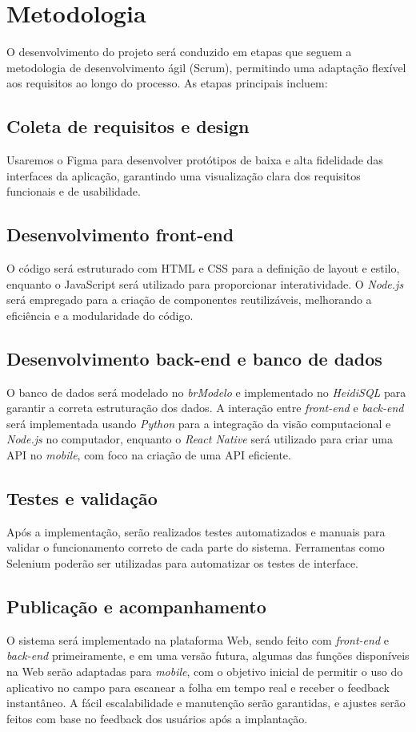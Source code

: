 \section{Metodologia}

O desenvolvimento do projeto será conduzido em etapas que seguem a metodologia de desenvolvimento ágil (Scrum), permitindo uma adaptação flexível aos requisitos ao longo do processo. As etapas principais incluem:

\subsection{Coleta de requisitos e design}
Usaremos o Figma para desenvolver protótipos de baixa e alta fidelidade das interfaces da aplicação, garantindo uma visualização clara dos requisitos funcionais e de usabilidade.

\subsection{Desenvolvimento front-end}
O código será estruturado com HTML e CSS para a definição de layout e estilo, enquanto o JavaScript será utilizado para proporcionar interatividade. O \textit{Node.js} será empregado para a criação de componentes reutilizáveis, melhorando a eficiência e a modularidade do código.

\subsection{Desenvolvimento back-end e banco de dados}
O banco de dados será modelado no \textit{brModelo} e implementado no \textit{HeidiSQL} para garantir a correta estruturação dos dados. A interação entre \textit{front-end} e \textit{back-end} será implementada usando \textit{Python} para a integração da visão computacional e \textit{Node.js} no computador, enquanto o \textit{React Native} será utilizado para criar uma API no \textit{mobile}, com foco na criação de uma API eficiente.

\subsection{Testes e validação}
Após a implementação, serão realizados testes automatizados e manuais para validar o funcionamento correto de cada parte do sistema. Ferramentas como Selenium poderão ser utilizadas para automatizar os testes de interface.

\subsection{Publicação e acompanhamento}
O sistema será implementado na plataforma Web, sendo feito com \textit{front-end} e \textit{back-end} primeiramente, e em uma versão futura, algumas das funções disponíveis na Web serão adaptadas para \textit{mobile}, com o objetivo inicial de permitir o uso do aplicativo no campo para escanear a folha em tempo real e receber o feedback instantâneo. A fácil escalabilidade e manutenção serão garantidas, e ajustes serão feitos com base no feedback dos usuários após a implantação.